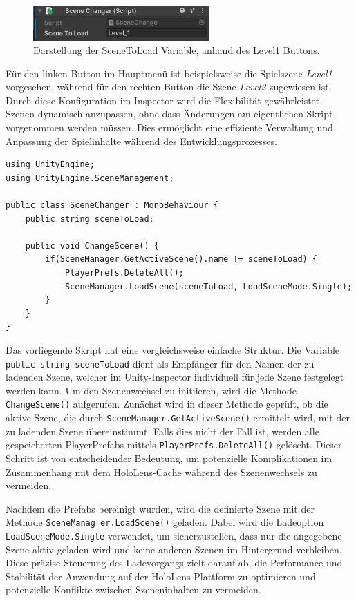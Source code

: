 \begin{figure}[H]
    \centering
    \includegraphics[width=0.6\textwidth]{images/sceneToLoad.png}
    \caption{Darstellung der SceneToLoad Variable, anhand des Level1 Buttons.}
    \label{fig:scenetoload}
\end{figure}

Für den linken Button im Hauptmenü ist beispielsweise die Spielszene \textit{Level1} vorgesehen, während für den rechten
Button die Szene \textit{Level2} zugewiesen ist. Durch diese Konfiguration im Inspector wird die Flexibilität gewährleistet,
Szenen dynamisch anzupassen, ohne dass Änderungen am eigentlichen Skript vorgenommen werden müssen. Dies ermöglicht eine
effiziente Verwaltung und Anpassung der Spielinhalte während des Entwicklungsprozesses.

\begin{lstlisting}[style=csharp, caption=Auf Knopfdruck Szene wechseln., label=code:scenechange]
using UnityEngine;
using UnityEngine.SceneManagement;

public class SceneChanger : MonoBehaviour {
    public string sceneToLoad;

    public void ChangeScene() {
        if(SceneManager.GetActiveScene().name != sceneToLoad) {
            PlayerPrefs.DeleteAll();
            SceneManager.LoadScene(sceneToLoad, LoadSceneMode.Single);
        }
    }
}
\end{lstlisting}

Das vorliegende Skript hat eine vergleichsweise einfache Struktur. Die Variable \texttt{public string sceneToLoad} dient als Empfänger für den Namen der zu ladenden Szene, welcher im Unity-Inspector individuell für jede Szene festgelegt werden kann. Um den Szenenwechsel zu initiieren, wird die Methode \texttt{ChangeScene()} aufgerufen. Zunächst wird in dieser Methode geprüft, ob die aktive Szene, die durch \texttt{SceneManager.GetActiveScene()} ermittelt wird, mit der zu ladenden Szene übereinstimmt. Falls dies nicht der Fall ist, werden alle gespeicherten PlayerPrefabs mittels \texttt{PlayerPrefs.DeleteAll()} gelöscht. Dieser Schritt ist von entscheidender Bedeutung, um potenzielle Komplikationen im Zusammenhang mit dem HoloLens-Cache während des Szenenwechsels zu vermeiden.

Nachdem die Prefabs bereinigt wurden, wird die definierte Szene mit der Methode \texttt{SceneManag er.LoadScene()} geladen. Dabei wird die Ladeoption \texttt{LoadSceneMode.Single} verwendet, um sicherzustellen, dass nur die angegebene Szene aktiv geladen wird und keine anderen Szenen im Hintergrund verbleiben. Diese präzise Steuerung des Ladevorgangs zielt darauf ab, die Performance und Stabilität der Anwendung auf der HoloLens-Plattform zu optimieren und potenzielle Konflikte zwischen Szeneninhalten zu vermeiden.


